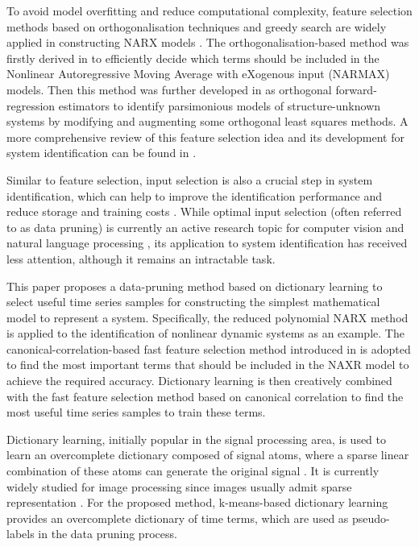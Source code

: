 \documentclass{article}
\begin{document}
To avoid model overfitting and reduce computational complexity, feature selection methods based on orthogonalisation techniques and greedy search are widely applied in constructing NARX models \cite{korenberg1988orthogonal, chen1989orthogonal, hong2008model}. 
The orthogonalisation-based method was firstly derived in \cite{korenberg1988orthogonal} to efficiently decide which terms should be included in the Nonlinear Autoregressive Moving Average with eXogenous input (NARMAX) models. 
Then this method was further developed in \cite{chen1989orthogonal} as orthogonal forward-regression estimators to identify parsimonious models of structure-unknown systems by modifying and augmenting some orthogonal least squares methods. 
A more comprehensive review of this feature selection idea and its development for system identification can be found in \cite{hong2008model}.

Similar to feature selection, input selection is also a crucial step in system identification, which can help to improve the identification performance and reduce storage and training costs \cite{goodwin1971optimal, mehra1974optimal, hong2008model}.
While optimal input selection (often referred to as data pruning) is currently an active research topic for computer vision \cite{raju2021accelerating, sorscher2022beyond, yang2024data} and natural language processing \cite{marion2023less, jin2024llm}, its application to system identification has received less attention, although it remains an intractable task. 

This paper proposes a data-pruning method based on dictionary learning to select useful time series samples for constructing the simplest mathematical model to represent a system.
Specifically, the reduced polynomial NARX method is applied to the identification of nonlinear dynamic systems as an example. 
The canonical-correlation-based fast feature selection method introduced in \cite{zhang2025canonical} is adopted to find the most important terms that should be included in the NAXR model to achieve the required accuracy. 
Dictionary learning is then creatively combined with the fast feature selection method based on canonical correlation to find the most useful time series samples to train these terms. 

Dictionary learning, initially popular in the signal processing area, is used to learn an overcomplete dictionary composed of signal atoms, where a sparse linear combination of these atoms can generate the original signal \cite{aharon2006k}.
It is currently widely studied for image processing since images usually admit sparse representation \cite{mairal2011task, vu2017fast}.
For the proposed method, k-means-based dictionary learning provides an overcomplete dictionary of time terms, which are used as pseudo-labels in the data pruning process. 
\end{document}
